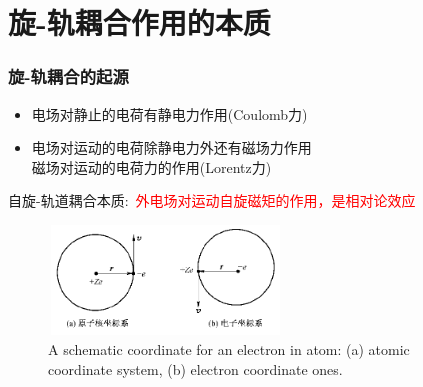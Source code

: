 \small
%
\section{旋-轨耦合作用的本质}
\frame
{
\frametitle{旋-轨耦合的起源}
\begin{itemize}
	\item 电场对静止的电荷有静电力作用(\textrm{Coulomb}力)
	\item 电场对运动的电荷除静电力外还有磁场力作用\\
	 磁场对运动的电荷力的作用(\textrm{Lorentz}力)
\end{itemize}
自旋-轨道耦合本质:~\textcolor{red}{外电场对运动自旋磁矩的作用，是相对论效应}
\begin{figure}[h!]
\centering
\includegraphics[height=1.15in,width=2.45in,viewport=0 0 600 270,clip]{Figures/SOC_cor.png}
\caption{\tiny \textrm{A schematic coordinate for an electron in atom: (a) atomic coordinate system, (b) electron coordinate ones.}}%
\label{Muffin_tin}
\end{figure}
}

